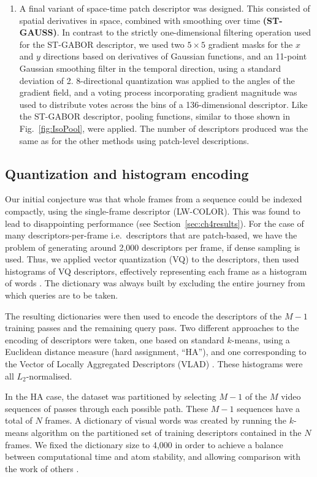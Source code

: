 \begin{enumerate}
\item A final variant of space-time patch descriptor was designed.  This consisted of spatial derivatives in space, combined with smoothing over time \textbf{(ST-GAUSS)}.  In contrast to the strictly one-dimensional filtering operation used for the ST-GABOR descriptor, we used two $5\times 5$ gradient masks for the $x$ and $y$ directions based on derivatives of Gaussian functions, and an 11-point Gaussian smoothing filter in the temporal direction, using a standard deviation of 2.  8-directional quantization was applied to the angles of the gradient field, and a voting process incorporating gradient magnitude was used to distribute votes across the bins of a 136-dimensional descriptor.  Like the ST-GABOR descriptor, pooling functions, similar to those shown in Fig.~\ref{fig:IsoPool}, were applied.  The number of descriptors produced was the same as for the other methods using patch-level descriptions.
\end{enumerate}


\subsection{Quantization and histogram encoding}

Our initial conjecture was that whole frames from a sequence could be indexed compactly, using the single-frame descriptor (LW-COLOR).  This was found to lead to disappointing performance (see Section~\ref{sec:ch4results}). For the case of many descriptors-per-frame i.e.\ descriptors that are patch-based, we have the problem of generating around 2,000 descriptors per frame, if dense sampling is used.  Thus, we applied vector quantization (VQ) to the descriptors, then used histograms of VQ descriptors, effectively representing each frame as a histogram of words \citep{Csurka2004}. The dictionary was always built by excluding the entire journey from which queries are to be taken.  

The resulting dictionaries were then used to encode the descriptors of the $M-1$ training passes and the remaining query pass. Two different approaches to the encoding of descriptors were taken, one based on standard $k$-means, using a Euclidean distance measure (hard assignment, ``HA''), and one corresponding to the Vector of Locally Aggregated Descriptors (VLAD) \citep{jegou2010aggregating}. These histograms were all $L_2$-normalised.  

In the HA case, the dataset was partitioned by selecting $M-1$ of the $M$ video sequences of passes through each possible path. These $M-1$ sequences have a total of $N$ frames. A dictionary of visual words was created by running the $k$-means algorithm on the partitioned set of training descriptors contained in the $N$ frames.   We fixed the dictionary size to 4,000 in order to achieve a balance between computational time and atom stability, and allowing comparison with the work of others \cite{Chatfield2011}.

